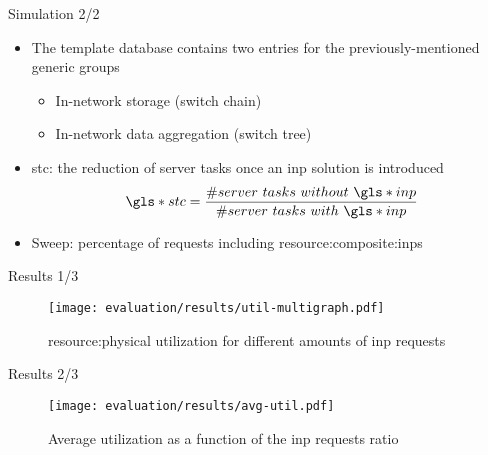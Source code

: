 \begin{frame}{Simulation 2/2}
    \begin{itemize}
        \item The template database contains two entries for the previously-mentioned generic groups
        \begin{itemize}
            \item In-network storage (switch chain)
            \item In-network data aggregation (switch tree)
        \end{itemize}
        \item \gls*{stc}: the reduction of server tasks once an \gls*{inp} solution is introduced
        \vspace{.2mm}
        \begin{equation}
        \label{stc_formula}
        \gls*{stc}=\dfrac{\#server\ tasks\ without\ \gls*{inp}}{\#server\ tasks\ with\ \gls*{inp}}
        \end{equation}
        \vspace{.2mm}
        \item Sweep: percentage of requests including \glspl{resource:composite:inp}
    \end{itemize}
\end{frame}

\begin{frame}{Results 1/3}
    \begin{figure}
        \captionsetup{font=scriptsize}
        \texttt{[image: evaluation/results/util-multigraph.pdf]}
        \caption{\gls*{resource:physical} utilization for different amounts of \gls*{inp} requests}
    \end{figure}
\end{frame}

\begin{frame}{Results 2/3}
    \vspace{4mm}
    \begin{figure}
        \captionsetup{font=footnotesize}
        \texttt{[image: evaluation/results/avg-util.pdf]}
        \vspace{2mm}
        \caption{Average  utilization as a function of the \gls*{inp} requests ratio}
    \end{figure}
\end{frame}

